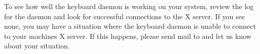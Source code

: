 To see how well the keyboard daemon is working on your system, review
the log for the daemon and look for successful connections to the X
server.  If you see none, you may have a situation where the keyboard
daemon is unable to connect to your machines X server.  If this
happens, please send mail to  and let
us know about your situation.

